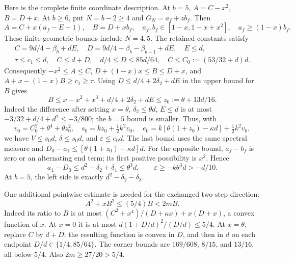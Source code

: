 Here is the complete finite coordinate description. At \(b=5\),
\(A=C-x^2\), \(B=D+x\). At \(b\ge6\), put \(N=b-2\ge4\)
and \(G_N=a_f+zb_f\). Then
\begin{equation}\label{eq:unit-ordinary:three-coordinates}
 A=C+x(a_f-E-1),\quad B=D+xb_f,\quad
 a_f,b_f\in[1-x,1-x+x^2],\quad a_f\ge(1-x)b_f.
\end{equation}
These finite geometric bounds include \(N=4,5\).
The retained constants satisfy
\[
 \begin{gathered}
 C=9d/4-\beta_b+dE,\quad
 D=9d/4-\beta_b-\beta_{b-1}+dE,\quad E\le d,\\
 \tau\le c_1\le d,\quad C\le d+D,\quad
 d/4\le D\le85d/64,\quad C\le C_0:=(53/32+d)d.
 \end{gathered}
\]
Consequently \(-x^2\le A\le C\),
\(D+(1-x)x\le B\le D+x\), and
\(A+x-(1-x)B\ge c_1\ge\tau\).
Using \(D\le d/4+2\delta_2+dE\) in the upper bound for \(B\)
gives
\[
 B\le x-x^2+x^3+d/4+2\delta_2+dE
   \le z_0:=\theta+13d/16.
\]
Indeed the difference after setting \(x=\theta\),
\(\delta_2\le\theta d\), \(E\le d\) is at most
\(-3/32+d/4+d^2\le-3/800\); the \(b=5\) bound is smaller.
Thus, with
\begin{equation}\label{eq:unit-ordinary:three-joint-data}
 v_0=C_0^2+\theta^4+\theta z_0^2,\quad
 s_0=kz_0+\tfrac12k^2v_0,\quad
 e_0=k[\theta(1+z_0)-\kappa d]+\tfrac12k^2v_0,
\end{equation}
we have \(V\le v_0d\), \(\delta\le s_0d\), and
\(\varepsilon\le e_0d\). The last bound uses the same spectral
measure and \(D_0-a_1\le[\theta(1+z_0)-\kappa d]d\).
For the opposite bound, \(a_f-b_f\) is zero or an alternating
end term; its first positive possibility is \(x^2\). Hence
\[
 a_1-D_0\le d^2-\delta_2+\delta_4\le\theta^3d,
 \qquad\varepsilon\ge-k\theta^3d>-d/10.
\]
At \(b=5\), the left side is exactly \(d^2-\delta_2-\delta_3\).

One additional pointwise estimate is needed for the exchanged
two-step direction:
\begin{equation}\label{eq:unit-ordinary:three-relative}
 A^2+xB^2\le(5/4)B<2mB.
\end{equation}
Indeed its ratio to \(B\) is at most
\((C^2+x^4)/(D+\kappa x)+x(D+x)\), a convex function of \(x\).
At \(x=0\) it is at most \(d(1+D/d)^2/(D/d)\le5/4\).
At \(x=\theta\), replace \(C\) by \(d+D\); the resulting function
is convex in \(D\), and then in \(d\) on each endpoint
\(D/d\in\{1/4,85/64\}\). The corner bounds are
\(169/608\), \(8/15\), and \(13/16\), all below \(5/4\).
Also \(2m\ge27/20>5/4\).

